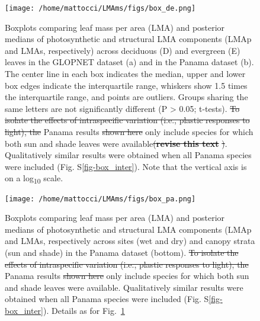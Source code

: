 \documentclass[
  12pt,
  a4paper,
,tablecaptionabove
]{scrartcl}
\providecommand{\DIFaddtex}[1]{{\protect\color{blue}\uwave{#1}}} %
\providecommand{\DIFdeltex}[1]{{\protect\color{red}\sout{#1}}}                      %
\providecommand{\DIFaddFL}[1]{\DIFadd{#1}} %
\providecommand{\DIFdelFL}[1]{\DIFdel{#1}} %
\providecommand{\DIFaddbeginFL}{} %
\providecommand{\DIFaddendFL}{} %
\providecommand{\DIFdelbeginFL}{} %
\providecommand{\DIFdelendFL}{} %
\providecommand{\DIFadd}[1]{\texorpdfstring{\DIFaddtex{#1}}{#1}} %
\providecommand{\DIFdel}[1]{\texorpdfstring{\DIFdeltex{#1}}{}} %
\newcommand{\DIFscaledelfig}{0.5}
\newlength{\DIFdelgraphicswidth} %
\newlength{\DIFdelgraphicsheight} %
\newcommand{\DIFaddincludegraphics}[2][]{{\color{blue}\fbox{\DIFOincludegraphics[#1]{#2}}}} %
\newcommand{\DIFdelincludegraphics}[2][]{%
\sbox{\DIFdelgraphicsbox}{\DIFOincludegraphics[#1]{#2}}%
\settoboxwidth{\DIFdelgraphicswidth}{\DIFdelgraphicsbox} %
\settoboxtotalheight{\DIFdelgraphicsheight}{\DIFdelgraphicsbox} %
\scalebox{\DIFscaledelfig}{%
\parbox[b]{\DIFdelgraphicswidth}{\usebox{\DIFdelgraphicsbox}\\[-\baselineskip] \rule{\DIFdelgraphicswidth}{0em}}\llap{\resizebox{\DIFdelgraphicswidth}{\DIFdelgraphicsheight}{%
\setlength{\unitlength}{\DIFdelgraphicswidth}%
\begin{picture}(1,1)%
\thicklines\linethickness{2pt} %
{\color[rgb]{1,0,0}\put(0,0){\framebox(1,1){}}}%
{\color[rgb]{1,0,0}\put(0,0){\line( 1,1){1}}}%
{\color[rgb]{1,0,0}\put(0,1){\line(1,-1){1}}}%
\end{picture}%
}\hspace*{3pt}}} %
} %
\DeclareRobustCommand{\DIFaddbeginFL}{\DIFOaddbeginFL \let\includegraphics\DIFaddincludegraphics} %
\DeclareRobustCommand{\DIFaddendFL}{\DIFOaddendFL \let\includegraphics\DIFOincludegraphics} %
\DeclareRobustCommand{\DIFdelbeginFL}{\DIFOdelbeginFL \let\includegraphics\DIFdelincludegraphics} %
\DeclareRobustCommand{\DIFdelendFL}{\DIFOaddendFL \let\includegraphics\DIFOincludegraphics} %
\begin{document}
\newpage

\begin{figure}

{\centering \texttt{[image: /home/mattocci/LMAms/figs/box\_de.png]}

}

\caption{\label{fig-boxplt_de}Boxplots comparing leaf mass per area
(LMA) and posterior medians of photosynthetic and structural LMA
components (LMAp and LMAs, respectively) across deciduous (D) and
evergreen (E) leaves in the GLOPNET dataset (a) and in the Panama
dataset (b). The center line in each box indicates the median, upper and
lower box edges indicate the interquartile range, whiskers show 1.5
times the interquartile range, and points are outliers. Groups sharing
the same letters are not significantly different (P \textgreater{} 0.05;
t-tests). \DIFdelbeginFL \DIFdelFL{To isolate the effects of intraspecific variation (i.e.,
plastic responses to light), the }\DIFdelendFL \DIFaddbeginFL \DIFaddFL{The }\DIFaddendFL Panama results \DIFdelbeginFL \DIFdelFL{shown here }\DIFdelendFL only include species for which both sun and
shade leaves were available\DIFdelbeginFL \DIFdelFL{(}\textbf{\DIFdelFL{revise this text}}%
\DIFdelFL{)}\DIFdelendFL . Qualitatively similar results were obtained
when all Panama species were included (Fig. S\ref{fig-box_inter}). Note
that the vertical axis is on a log\textsubscript{10} scale.}

\end{figure}

\newpage

\begin{figure}

{\centering \texttt{[image: /home/mattocci/LMAms/figs/box\_pa.png]}

}

\caption{\label{fig-boxplt_pa}Boxplots comparing leaf mass per area
(LMA) and posterior medians of photosynthetic and structural LMA
components (LMAp and LMAs, respectively across sites (wet and dry) and
canopy strata (sun and shade) in the Panama dataset (bottom). \DIFdelbeginFL \DIFdelFL{To isolate
the effects of intraspecific variation (i.e., plastic responses to
light), the }\DIFdelendFL \DIFaddbeginFL \DIFaddFL{The }\DIFaddendFL Panama
results \DIFdelbeginFL \DIFdelFL{shown here }\DIFdelendFL only include species for which both sun and shade leaves were
available. Qualitatively similar results were obtained when all Panama
species were included (Fig. S\ref{fig-box_inter}). Details as for
Fig.~\ref{fig-boxplt_de}\DIFaddbeginFL \DIFaddFL{.}\DIFaddendFL }

\end{figure}
\end{document}
